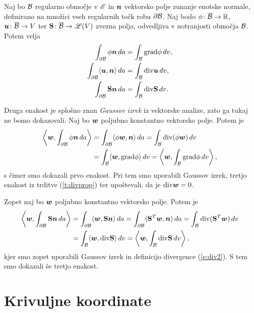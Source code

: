 \begin{izrek} \label{i:divtheo}
	Naj bo $\mathcal B$ regularno območje v $\mathscr E$ in $\boldsymbol n$ vektorsko polje zunanje enotske normale,
	definirano na množici vseh regularnih točk robu $\partial \mathcal B$. Naj bodo $\phi\colon\overline{\mathcal B}\to\mathbb R$,
	$\boldsymbol u\colon\overline{\mathcal B}\to V$ ter $\mathbf S\colon\overline{\mathcal B}\to\mathscr L(V)$
	zvezna polja, odvedljiva v notranjosti območja $\mathcal B$. Potem velja
	\begin{align*}
		\int_{\partial \mathcal B} \phi\boldsymbol n\,da &= \int_{\mathcal B} \mathrm{grad}\phi\,dv, \\
		\int_{\partial \mathcal B} \langle\boldsymbol u,\boldsymbol n\rangle\,da &= \int_{\mathcal B} \mathrm{div}\boldsymbol u\,dv, \\
		\int_{\partial \mathcal B} \mathbf S\boldsymbol n\,da &= \int_{\mathcal B} \mathrm{div}\mathbf S\,dv.
	\end{align*}
\end{izrek}
\proof
	Druga enakost je splošno znan \emph{Gaussov izrek} iz vektorske analize, zato ga tukaj ne bomo dokazovali.
	Naj bo $\boldsymbol w$ poljubno konstantno vektorsko polje. Potem je
	\begin{align*}
		\left<\boldsymbol w,\int_{\partial \mathcal B}\phi\boldsymbol n\,da\right>
		&= \int_{\partial \mathcal B}\langle\phi\boldsymbol w,\boldsymbol n\rangle\,da=
		\int_{\mathcal B}\mathrm{div}(\phi\boldsymbol w)\,dv \\
		&= \int_{\mathcal B}\langle\boldsymbol w,\mathrm{grad}\phi\rangle \,dv = \left<\boldsymbol w,\int_{\mathcal B}\mathrm{grad}\phi \,dv\right>,
	\end{align*}
	s čimer smo dokazali prvo enakost.
	Pri tem smo uporabili Gaussov izrek, tretjo enakost iz trditve (\ref{t:divprop}) ter
	upoštevali, da je $\mathrm{div}\boldsymbol w=0$.
	
	Zopet naj bo $\boldsymbol w$ poljubno konstantno vektorsko polje. Potem je
	\begin{align*}
		\left<\boldsymbol w,\int_{\partial \mathcal B}\mathbf S\boldsymbol n\,da\right>
		&= \int_{\partial \mathcal B}\langle\boldsymbol w,\mathbf S\boldsymbol n\rangle\,da=
		\int_{\partial \mathcal B}\langle\mathbf S^T\boldsymbol w,\boldsymbol n\rangle\,da=
		\int_{\mathcal B}\mathrm{div}(\mathbf S^T\boldsymbol w)\,dv \\ &=\int_{\mathcal B}\langle\boldsymbol w,\mathrm{div}\mathbf S\rangle\,dv=
		\left<\boldsymbol w,\int_{\mathcal B}\mathrm{div}\mathbf S\,dv\right>,
	\end{align*}
	kjer smo zopet uporabili Gaussov izrek in definicijo divergence (\ref{e:div2}). S tem smo dokazali še tretjo enakost.
\endproof


\section{Krivuljne koordinate} \label{s:koordinate}


